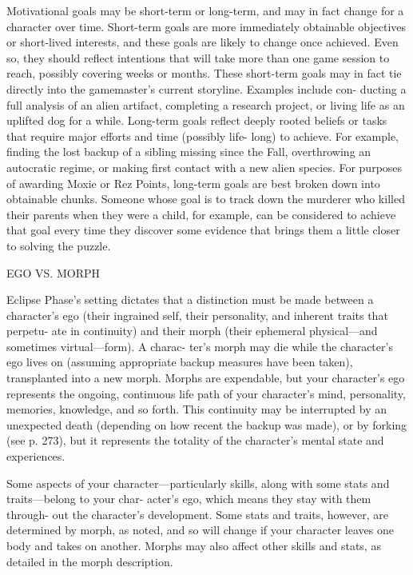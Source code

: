 
Motivational goals may be short-term or long-term,
and may in fact change for a character over time.
Short-term goals are more immediately obtainable
objectives or short-lived interests, and these goals are
likely to change once achieved. Even so, they should
reflect intentions that will take more than one game
session to reach, possibly covering weeks or months.
These short-term goals may in fact tie directly into the
gamemaster's current storyline. Examples include con-
ducting a full analysis of an alien artifact, completing
a research project, or living life as an uplifted dog for a
while. Long-term goals reflect deeply rooted beliefs or
tasks that require major efforts and time (possibly life-
long) to achieve. For example, finding the lost backup
of a sibling missing since the Fall, overthrowing an
autocratic regime, or making first contact with a new
alien species. For purposes of awarding Moxie or Rez
Points, long-term goals are best broken down into
obtainable chunks. Someone whose goal is to track
down the murderer who killed their parents when they
were a child, for example, can be considered to achieve
that goal every time they discover some evidence that
brings them a little closer to solving the puzzle.

EGO VS. MORPH

Eclipse Phase's setting dictates that a distinction must
be made between a character's ego (their ingrained
self, their personality, and inherent traits that perpetu-
ate in continuity) and their morph (their ephemeral
physical—and sometimes virtual—form). A charac-
ter's morph may die while the character's ego lives on
(assuming appropriate backup measures have been
taken), transplanted into a new morph. Morphs are
expendable, but your character's ego represents the
ongoing, continuous life path of your character's mind,
personality, memories, knowledge, and so forth. This
continuity may be interrupted by an unexpected death
(depending on how recent the backup was made), or
by forking (see p. 273), but it represents the totality of
the character's mental state and experiences.

Some aspects of your character—particularly skills,
along with some stats and traits—belong to your char-
acter's ego, which means they stay with them through-
out the character's development. Some stats and traits,
however, are determined by morph, as noted, and so
will change if your character leaves one body and
takes on another. Morphs may also affect other skills
and stats, as detailed in the morph description.

